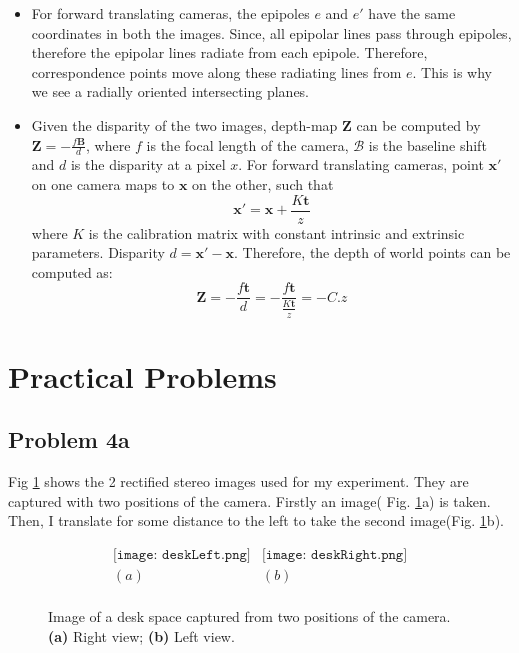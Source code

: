 \documentclass[11pt]{article}
\newcommand{\Bb}{\mathcal{B}}
\newcommand{\xB}{\mathbf{x}}
\newcommand{\tB}{\mathbf{t}}
\begin{document}
\begin{itemize}
  \item For forward translating cameras, the epipoles $e$ and $e'$ have the same coordinates in both the images. Since, all epipolar lines pass through epipoles, therefore the epipolar lines radiate from each epipole. Therefore, correspondence points move along these radiating lines from $e$. This is why we see a radially oriented intersecting planes. 
  \item Given the disparity of the two images, depth-map $\mathbf{Z}$ can be computed by $\mathbf{Z} =- \frac{f \mathbf{B}}{d}$, where $f$ is the focal length of the camera, $\Bb$ is the baseline shift and $d$ is the disparity at a pixel $x$. For forward translating cameras, point $\xB'$ on one camera maps to $\xB$ on the other, such that 
\begin{equation*}
 \xB' = \xB +  \frac{K \tB}{z}
\end{equation*}
where $K$ is the calibration matrix with constant intrinsic and extrinsic parameters. Disparity $d = \xB' - \xB$.  Therefore, the depth of world points can be computed as:
\begin{equation*}
  \mathbf{Z} = - \frac{f\tB}{d} = -\frac{f \tB}{ \frac{K \tB}{z}} = - C.z
\end{equation*}
\end{itemize}

   \vspace{-10pt}
\section{Practical Problems}
    \vspace{-10pt}
\subsection{Problem 4a}
    \vspace{-10pt}
\par Fig \ref{fig1} shows the 2 rectified stereo images used for my experiment.  They are captured with two positions of the camera. Firstly an image( Fig. \ref{fig1}a) is taken. Then, I translate for some distance to the left to take the second image(Fig. \ref{fig1}b). 

\begin{figure}[!hbt]
\vspace{-10pt}
 \begin{center}
  \[ \begin{array}{cc}
	  \texttt{[image: deskLeft.png]} &
	  \texttt{[image: deskRight.png]} \\
	  (a) & (b) \\
	  \end{array} \]
  \end{center}
  \vspace{-10pt}
  \caption{ Image of a desk space captured from two positions of the camera. {\bf (a)} Right view; {\bf (b)} Left view. }
  \label{fig1}
    \vspace{-10pt}
\end{figure}
\end{document}
